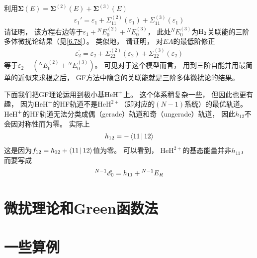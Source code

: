 {利用$\mathbf{\Sigma}(E) = \mathbf{\Sigma}^{(2)}(E)+\mathbf{\Sigma}^{(3)}(E)$
    \begin{align*}
    \varepsilon_{1}'=\varepsilon_{1}+\Sigma_{11}^{(2)}\left(\varepsilon_{1}\right)+\Sigma_{11}^{(3)}\left(\varepsilon_{1}\right)
    \end{align*}
请证明，
该方程右边等于$\varepsilon_{1}+{}^{N}E_{0}^{(2)}+{}^{N} E_{0}^{(3)}$，
此处${}^{N}E_{0}^{(3)}$为$\mathrm{H}_2$关联能的三阶多体微扰论结果（见\eqref{6.78}）。
类似地，
请证明，
对$EA$的最低阶修正
    \begin{align*}
    \varepsilon_{2}^{\prime}=\varepsilon_{2}+\Sigma_{22}^{(2)}\left(\varepsilon_{2}\right)+\Sigma_{22}^{(3)}\left(\varepsilon_{2}\right)
    \end{align*}
等于$\varepsilon_{2}-({}^{N} E_{0}^{(2)}+{}^{N} E_{0}^{(3)})$。
可见对于这个模型而言，
用到三阶自能并用最简单的近似来求根之后，
GF方法中隐含的关联能就是三阶多体微扰论的结果。

}

下面我们把GF理论运用到极小基$\mathrm{HeH}^+$上。
这个体系稍复杂一些，
但因此也更有趣，
因为$\mathrm{HeH}^+$的HF轨道不是$\mathrm{HeH}^{2+}$（即对应的$(N-1)$系统）的最优轨道。
$\mathrm{HeH}^+$的HF轨道无法分类成偶（gerade）轨道和奇（ungerade）轨道，
因此$h_{12}$不会因对称性而为零。
实际上
\begin{align}
h_{12} = -\Braket{11|12}
\end{align}
这是因为$f_{12} = h_{12} + \Braket{11|12}$值为零。
可以看到，
$\mathrm{HeH}^{2+}$的基态能量并非$h_{11}$，
而要写成
\begin{align}
{}^{N-1}\mathscr{E}_0 = h_{11} + {}^{N-1}E_R
\end{align}
\section{微扰理论和Green函数法}
\section{一些算例}
\theendnotes
